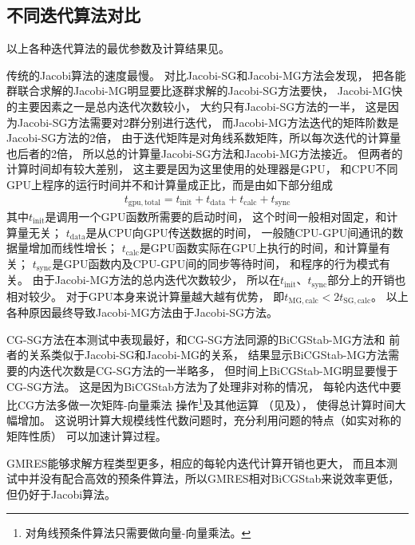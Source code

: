 \subsection{不同迭代算法对比}

以上各种迭代算法的最优参数及计算结果见。

传统的Jacobi算法的速度最慢。
对比Jacobi-SG和Jacobi-MG方法会发现，
把各能群联合求解的Jacobi-MG明显要比逐群求解的Jacobi-SG方法要快，
Jacobi-MG快的主要因素之一是总内迭代次数较小，
大约只有Jacobi-SG方法的一半，
这是因为Jacobi-SG方法需要对2群分别进行迭代，
而Jacobi-MG方法迭代的矩阵阶数是Jacobi-SG方法的2倍，
由于迭代矩阵是对角线系数矩阵，所以每次迭代的计算量也后者的2倍，
所以总的计算量Jacobi-SG方法和Jacobi-MG方法接近。
但两者的计算时间却有较大差别，
这主要是因为这里使用的处理器是GPU，
和CPU不同GPU上程序的运行时间并不和计算量成正比，而是由如下部分组成
\begin{align}
  t_\mathrm{gpu,total} = t_\mathrm{init} + t_\mathrm{data} + t_\mathrm{calc} + t_\mathrm{sync}
\end{align}
其中$t_\mathrm{init}$是调用一个GPU函数所需要的启动时间，
这个时间一般相对固定，和计算量无关；
$t_\mathrm{data}$是从CPU向GPU传送数据的时间，
一般随CPU-GPU间通讯的数据量增加而线性增长；
$t_\mathrm{calc}$是GPU函数实际在GPU上执行的时间，和计算量有关；
$t_\mathrm{sync}$是GPU函数内及CPU-GPU间的同步等待时间，
和程序的行为模式有关。
由于Jacobi-MG方法的总内迭代次数较少，
所以在$t_\mathrm{init}$、$t_\mathrm{sync}$部分上的开销也相对较少。
对于GPU本身来说计算量越大越有优势，
即$t_\mathrm{MG,calc}<2t_\mathrm{SG,calc}$。
以上各种原因最终导致Jacobi-MG方法由于Jacobi-SG方法。

CG-SG方法在本测试中表现最好，和CG-SG方法同源的BiCGStab-MG方法和
前者的关系类似于Jacobi-SG和Jacobi-MG的关系，
结果显示BiCGStab-MG方法需要的内迭代次数是CG-SG方法的一半略多，
但时间上BiCGStab-MG明显要慢于CG-SG方法。
这是因为BiCGStab方法为了处理非对称的情况，
每轮内迭代中要比CG方法多做一次矩阵-向量乘法
操作\footnote{对角线预条件算法只需要做向量-向量乘法。}及其他运算
（见及），
使得总计算时间大幅增加。
这说明计算大规模线性代数问题时，充分利用问题的特点（如实对称的矩阵性质）
可以加速计算过程。

GMRES能够求解方程类型更多，相应的每轮内迭代计算开销也更大，
而且本测试中并没有配合高效的预条件算法，所以GMRES相对BiCGStab来说效率更低，
但仍好于Jacobi算法。

